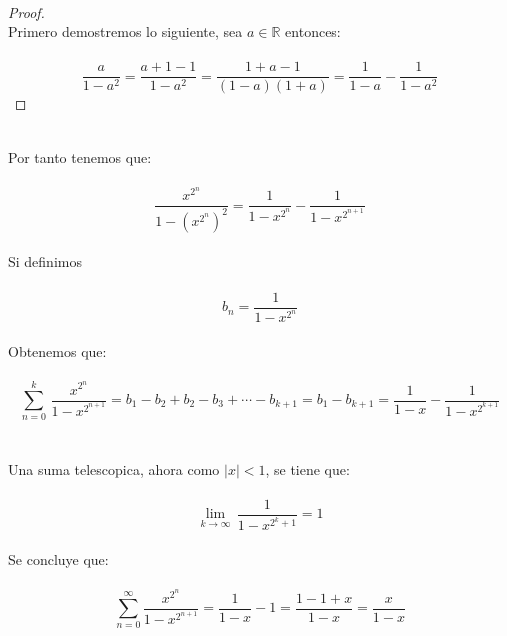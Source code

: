\documentclass[11pt,letterpaper]{article}
\newcommand{\R}{\mathbb{R}}
\begin{document}
\,\\
\begin{proof}\,\\
    Primero demostremos lo siguiente, sea $a\in \R$ entonces:\,\\
    \,\\
    \begin{equation*}
        \frac{a}{1-a^2}=\frac{a+1-1}{1-a^2}=\frac{1+a-1}{(1-a)(1+a)}=\frac{1}{1-a}-\frac{1}{1-a^2}
    \end{equation*}
    
\end{proof}\,\\
Por tanto tenemos que:\,\\
\,\\
\begin{equation*}
    \frac{x^{2^{n}}}{1-(x^{2^{n}})^2}=\frac{1}{1-x^{2^n}}-\frac{1}{1-x^{2^{n+1}}}
\end{equation*}\,\\
Si definimos\,\\
\,\\
\begin{equation*}
    b_n=\frac{1}{1-x^{2^n}}
\end{equation*}\,\\
Obtenemos que:\,\\
\,\\
\begin{equation*}
    \sum_{n=0}^k\,\frac{x^{2^n}}{1-x^{2^{n+1}}}=b_1-b_2+b_2-b_3+\cdots-b_{k+1}=b_1-b_{k+1}=\frac{1}{1-x}-\frac{1}{1-x^{2^{k+1}}}
\end{equation*}\,\\
\,\\
Una suma telescopica, ahora como $|x|<1$, se tiene que:\,\\
\,\\
\begin{equation*}
    \lim_{k\rightarrow \infty}\,\frac{1}{1-x^{2^k+1}}=1
\end{equation*}\,\\
Se concluye que:\,\\
\,\\
\begin{equation*}
    \sum_{n=0}^{\infty}\frac{x^{2^n}}{1-x^{2^{n+1}}}=\frac{1}{1-x}-1=\frac{1-1+x}{1-x}=\frac{x}{1-x}
\end{equation*}
\end{document}
